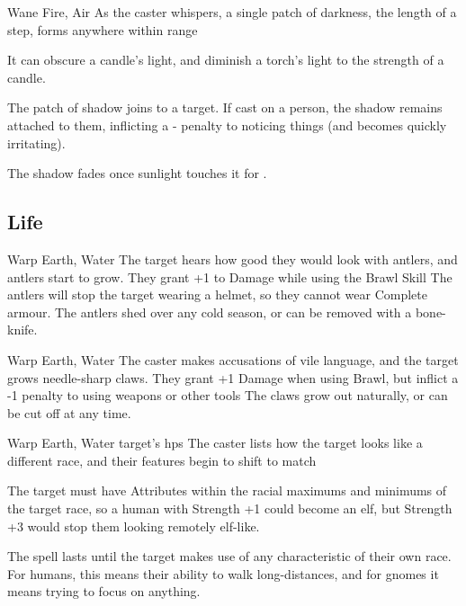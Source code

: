 \begin{multicols}{2}

  {}%
  {Wane}%
  {Fire, Air}%
  {}%
  {As the caster whispers, a single patch of darkness, the length of a step, forms anywhere within range}%
  {It can obscure a candle's light, and diminish a torch's light to the strength of a candle.

    The patch of shadow joins to a target.
    If cast on a person, the shadow remains attached to them, inflicting a - penalty to noticing things (and becomes quickly irritating).

    The shadow fades once sunlight touches it for .}

\subsection{Life}


  {}%
  {Warp}%
  {Earth, Water}%
  {}%
  {The target hears how good they would look with antlers, and antlers start to grow.
  They grant +1 to Damage while using the Brawl Skill}%
  {
  The antlers will stop the target wearing a helmet, so they cannot wear Complete armour.
  The antlers shed over any cold season, or can be removed with a bone-knife.}

  {}%
  {Warp}%
  {Earth, Water}%
  {}%
  {The caster makes accusations of vile language, and the target grows needle-sharp claws.
  They grant +1 Damage when using Brawl, but inflict a -1 penalty to using weapons or other tools}%
  {
  The claws grow out naturally, or can be cut off at any time.}

  {}%
  {Warp}%
  {Earth, Water}%
  {target's \glspl{hp}}%
  {The caster lists how the target looks like a different race, and their features begin to shift to match}%
  {The target must have Attributes within the racial maximums and minimums of the target race, so a human with Strength +1 could become an elf, but Strength +3 would stop them looking remotely elf-like.

  The spell lasts until the target makes use of any characteristic of their own race.
  For humans, this means their ability to walk long-distances, and for gnomes it means trying to focus on anything.}


\end{multicols}
